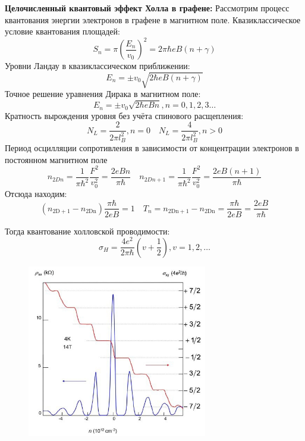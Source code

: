 \textbf{Целочисленный квантовый эффект Холла в графене:}
Рассмотрим процесс квантования энергии электронов в графене в магнитном поле.
Квазиклассическое условие квантования площадей:
$$
S_n=\pi\left(\frac{E_n}{v_0}\right)^2=2 \pi \hbar e B(n+\gamma)
$$
Уровни Ландау в квазиклассическом приближении:
$$
E_n= \pm v_0 \sqrt{2 \hbar e B(n+\gamma)}
$$
Точное решение уравнения Дирака в магнитном поле:
$$
E_n= \pm v_0 \sqrt{2 \hbar e B n}, n=0,1,2,3 \ldots
$$
Кратность вырождения уровня без учёта спинового расщепления:
$$
N_L=\frac{2}{2 \pi l_B^2}, n=0 \quad N_L=\frac{4}{2 \pi l_B^2}, n>0
$$
Период осцилляции сопротивления в зависимости от концентрации электронов в постоянном магнитном поле
$$
n_{2 D n}=\frac{1}{\pi \hbar^2} \frac{F^2}{v_0^2}=\frac{2 e B n}{\pi \hbar} \quad n_{2 D n+1}=\frac{1}{\pi \hbar^2} \frac{F^2}{v_0^2}=\frac{2 e B(n+1)}{\pi \hbar}
$$
Отсюда находим:
$$
\left(n_{2 \mathrm{D}+1}-n_{2 \mathrm{Dn}}\right) \frac{\pi \hbar}{2 e B}=1 \quad  T_n=n_{2 \mathrm{Dn}+1}-n_{2 \mathrm{Dn}}=\frac{\pi \hbar}{2 e B}=\frac{2 e B}{\pi \hbar}
$$

Тогда квантование холловской проводимости:
$$
\sigma_H=\frac{4 e^2}{2 \pi \hbar}\left(v+\frac{1}{2}\right), v=1,2, \ldots
$$

\begin{figure}[h!]
\centering
 \includegraphics[width=0.7\textwidth]{images/ph31.4.jpg}
\end{figure}